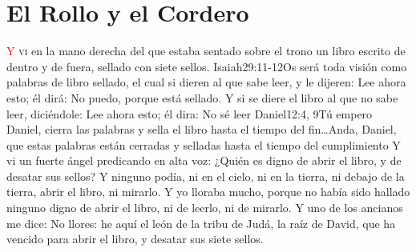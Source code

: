 \chapter{El Rollo y el Cordero}
\lettrine[lines=3,slope=-0.5em,loversize=0.1]{\textcolor{red}{Y}}{\hspace{0.5em} vi} en la mano derecha del que estaba sentado sobre el trono un libro escrito de dentro y de fuera, sellado con siete sellos.%
 					{Isaiah}{29:11-12}{Os será toda visión como palabras de libro sellado, el cual si dieren al que sabe leer, y le dijeren: Lee ahora esto; él dirá: No puedo, porque está sellado. Y si se diere el libro al que no sabe leer, diciéndole: Lee ahora esto; él dira: No sé leer}%
 					{Daniel}{12:4, 9}{Tú empero Daniel, cierra las palabras y sella el libro hasta el tiempo del fin\ldots Anda, Daniel, que estas palabras están cerradas y selladas hasta el tiempo del cumplimiento} %
Y vi un fuerte ángel predicando en alta voz: ¿Quién es digno de abrir el libro, y de desatar sus sellos? %
Y ninguno podía, ni en el cielo, ni en la tierra, ni debajo de la tierra, abrir el libro, ni mirarlo. %
Y yo lloraba mucho, porque no había sido hallado ninguno digno de abrir el libro, ni de leerlo, ni de mirarlo. %
Y uno de los ancianos me dice: No llores: he aquí el león de la tribu de Judá,%
 la raíz de David,%
 que ha vencido para abrir el libro, y desatar sus siete sellos. 
 
